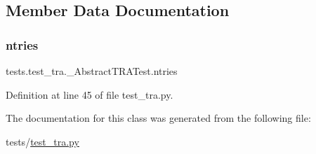 \subsection{Member Data Documentation}
\mbox{\label{classtests_1_1test__tra_1_1__AbstractTRATest_ad32ac0cefbe9f77b0b1541085cf5365a}} 
\subsubsection{\texorpdfstring{ntries}{ntries}}
{\footnotesize\ttfamily tests.\+test\+\_\+tra.\+\_\+\+Abstract\+T\+R\+A\+Test.\+ntries\hspace{0.3cm}{\ttfamily [static]}}



Definition at line 45 of file test\+\_\+tra.\+py.



The documentation for this class was generated from the following file\+:\begin{DoxyCompactItemize}
\item 
tests/\hyperlink{test__tra_8py}{test\+\_\+tra.\+py}\end{DoxyCompactItemize}
